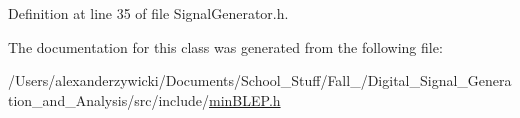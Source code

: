 Definition at line 35 of file Signal\+Generator.\+h.



The documentation for this class was generated from the following file\+:\begin{DoxyCompactItemize}
\item 
/\+Users/alexanderzywicki/\+Documents/\+School\+\_\+\+Stuff/\+Fall\+\_/\+Digital\+\_\+\+Signal\+\_\+\+Generation\+\_\+and\+\_\+\+Analysis/src/include/\hyperlink{min_b_l_e_p_8h}{min\+B\+L\+E\+P.\+h}\end{DoxyCompactItemize}
